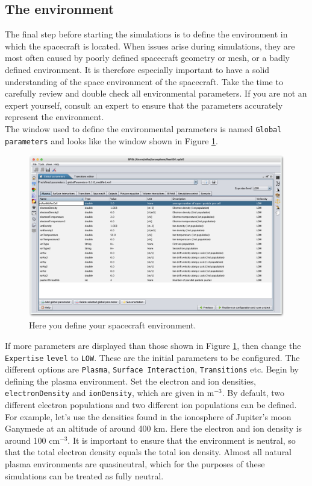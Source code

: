 \documentclass[a4paper, 12pt]{article}
\begin{document}
\subsection{The environment}
\vspace{2mm}

The final step before starting the simulations is to define the environment in which the spacecraft is located. When issues arise during simulations, they are most often caused by poorly defined spacecraft geometry or mesh, or a badly defined environment. It is therefore especially important to have a solid understanding of the space environment of the spacecraft. Take the time to carefully review and double check all environmental parameters. If you are not an expert yourself, consult an expert to ensure that the parameters accurately represent the environment.\\

The window used to define the environmental parameters is named \verb|Global parameters| and looks like the window shown in Figure \ref{17}.\\

\begin{figure}[!ht]
    \centering
    \includegraphics[width=1\textwidth]{fig17.jpg}
    \caption{Here you define your spacecraft environment.}
     \label{17}
\end{figure}

If more parameters are displayed than those shown in Figure \ref{17}, then change the \verb|Expertise| \verb|level| to \verb|LOW|. These are the initial parameters to be configured. The different options are \verb|Plasma|, \verb|Surface Interaction|, \verb|Transitions| etc. Begin by defining the plasma environment. Set the electron and ion densities, \verb|electronDensity| and \verb|ionDensity|, which are given in m$^{-3}$. By default, two different electron populations and two different ion populations can be defined. For example, let's use the densities found in the ionosphere of Jupiter's moon Ganymede at an altitude of around 400 km. Here the electron and ion density is around 100 cm$^{-3}$. It is important to ensure that the environment is neutral, so that the total electron density equals the total ion density. Almost all natural plasma environments are quasineutral, which for the purposes of these simulations can be treated as fully neutral.\\
\end{document}

